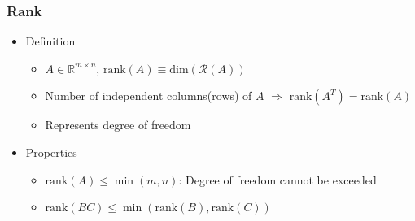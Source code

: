 \subsubsection*{Rank}
\begin{itemize}
    \item Definition
    \begin{itemize}
        \item $A \in \mathbb{R}^{m \times n}$, $\mathrm{rank}(A) \equiv \mathrm{dim}(\mathcal{R}(A))$
        \item Number of independent columns(rows) of $A$ $\Rightarrow$ $\mathrm{rank}(A^T) = \mathrm{rank}(A)$
        \item Represents degree of freedom
    \end{itemize}
    \pagebreak
    \item Properties
    \begin{itemize}
        \item $\mathrm{rank}(A) \leq \min(m, n)$: Degree of freedom cannot be exceeded
        \item $\mathrm{rank}(BC) \leq \min(\mathrm{rank}(B), \mathrm{rank}(C))$
    \end{itemize}
\end{itemize}

